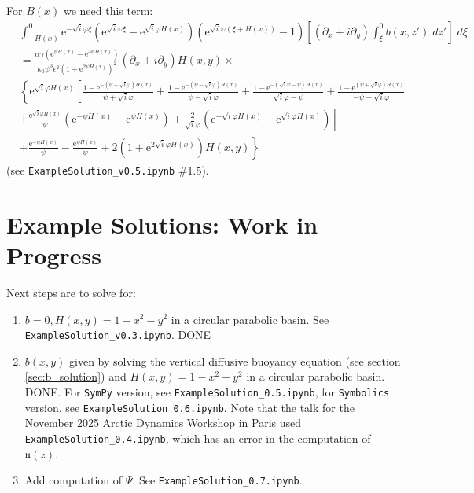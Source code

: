 \documentclass[10pt]{amsart}
\begin{document}
For $B(x)$ we need this term:
 \begin{align}
& \int_{-H(x)}^{0} 
\mathrm{e}^{-\sqrt{i} \varphi \xi} 
\left(
\mathrm{e}^{\sqrt{i} \varphi \xi} - 
\mathrm{e}^{\sqrt{i} \varphi H(x)} 
\right) \left(
\mathrm{e}^{\sqrt{i} \varphi  \left( \xi + H(x) \right)} - 1
\right)
 \left[ \left( \partial_x + i \partial_y \right) \int_{\xi}^{0} b(x,z') \; dz'  \right] \; d \xi   \nonumber  \\
& =
\frac{ \alpha  \gamma\left(\mathrm{e}^{\psi H(x)} -  \mathrm{e}^{3 \psi H(x)}  \right)}{\kappa_0  \psi^{3} \epsilon^{2} \left( 1 + \mathrm{e}^{2 \psi H(x)} \right)^{2}}
\left( \partial_x + i \partial_y \right) H(x,y) \times \nonumber \\
&\left\{
   \mathrm{e}^{\sqrt{i} \varphi H(x) } 
   \left[
   \frac{1 - \mathrm{e}^{-\left( \psi + \sqrt{i} \varphi \right) H(x)}}{\psi + \sqrt{i} \varphi}
+ \frac{1 - \mathrm{e}^{-\left( \psi - \sqrt{i} \varphi \right) H(x)}}{\psi - \sqrt{i} \varphi}
+ \frac{1 - \mathrm{e}^{-\left( \sqrt{i} \varphi - \psi \right) H(x)}}{\sqrt{i} \varphi - \psi}
+ \frac{1 - \mathrm{e}^{  \left( \psi + \sqrt{i} \varphi \right) H(x)}}{-\psi - \sqrt{i} \varphi}
\right.\right. \nonumber \\ 
& \left.\left.
+ \frac{\mathrm{e}^{\sqrt{i} \varphi H(x)}}{\psi} \left(      \mathrm{e}^{- \psi H(x) }
-  \mathrm{e}^{  \psi H(x) } \right)
+ \frac{2}{\sqrt{i} \varphi} \left( \mathrm{e}^{- \sqrt{i} \varphi H(x) }
-   \mathrm{e}^{ \sqrt{i} \varphi H(x)} \right)
\right] \right. \nonumber \\
& \left.
+ \frac{  \mathrm{e}^{-\psi H(x)}}{\psi}
- \frac{  \mathrm{e}^{ \psi H(x)}}{\psi}
+ 2 \left( 1 +  \mathrm{e}^{2 \sqrt{i} \varphi H(x)}\right) H(x,y)
\right\}
\end{align}
(see \texttt{ExampleSolution\_v0.5.ipynb} \#1.5).


\section{Example Solutions: Work in Progress}

Next steps are to solve for:
\begin{enumerate}
\item $b=0, H(x,y) = 1 - x^2 - y^2$ in a circular parabolic basin. See \texttt{ExampleSolution\_v0.3.ipynb}.  DONE
\item $b(x,y)$ given by solving the vertical diffusive buoyancy equation (see section \ref{sec:b_solution}) and $H(x,y) = 1 - x^2 - y^2$ in a circular parabolic basin. DONE. For \texttt{SymPy} version, see \texttt{ExampleSolution\_0.5.ipynb}, for \texttt{Symbolics} version, see \texttt{ExampleSolution\_0.6.ipynb}. Note that the talk for the November 2025 Arctic Dynamics Workshop in Paris used \texttt{ExampleSolution\_0.4.ipynb}, which has an error in the computation of $\mathfrak{u}(z)$.
\item Add computation of $\Psi$. See \texttt{ExampleSolution\_0.7.ipynb}.
\end{enumerate}



\end{document}
